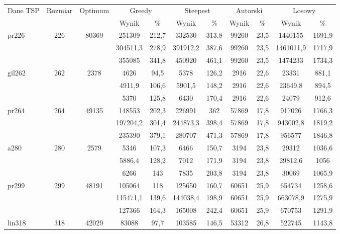 \begin{adjustwidth}{-1in}{-1in}
\begin{center}
\begin{tabular}{lcccccccccc}
\toprule
 \multirow{2}{*}{Dane TSP} & \multirow{2}{*}{Rozmiar} & \multirow{2}{*}{Optimum} & \multicolumn{2}{c}{Greedy} & \multicolumn{2}{c}{Steepest} & \multicolumn{2}{c}{Autorski} & \multicolumn{2}{c}{Losowy} \\
 & & & Wynik & \% & Wynik & \% & Wynik & \% & Wynik & \% \\
\toprule
\multirow{3}{*}{pr226} & \multirow{3}{*}{226} & \multirow{3}{*}{80369} & 251309 & 212,7  & 332530 & 313,8  & 99260 & 23,5  & 1440155 & 1691,9 \\
 & &  & 304511,3 & 278,9  & 391912,2 & 387,6  & 99260 & 23,5  & 1461011,9 & 1717,9 \\
 & &  & 355085 & 341,8  & 450920 & 461,1  & 99260 & 23,5  & 1474233 & 1734,3 \\
\midrule
\multirow{3}{*}{gil262} & \multirow{3}{*}{262} & \multirow{3}{*}{2378} & 4626 & 94,5  & 5378 & 126,2  & 2916 & 22,6  & 23331 & 881,1 \\
 & &  & 4911,9 & 106,6  & 5901,5 & 148,2  & 2916 & 22,6  & 23649,8 & 894,5 \\
 & &  & 5370 & 125,8  & 6430 & 170,4  & 2916 & 22,6  & 24079 & 912,6 \\
\midrule
\multirow{3}{*}{pr264} & \multirow{3}{*}{264} & \multirow{3}{*}{49135} & 148553 & 202,3  & 226991 & 362  & 57869 & 17,8  & 917026 & 1766,3 \\
 & &  & 197204,2 & 301,4  & 244873,3 & 398,4  & 57869 & 17,8  & 943002,8 & 1819,2 \\
 & &  & 235390 & 379,1  & 280707 & 471,3  & 57869 & 17,8  & 956577 & 1846,8 \\
\midrule
\multirow{3}{*}{a280} & \multirow{3}{*}{280} & \multirow{3}{*}{2579} & 5346 & 107,3  & 6466 & 150,7  & 3194 & 23,8  & 29312 & 1036,6 \\
 & &  & 5886,4 & 128,2  & 7012 & 171,9  & 3194 & 23,8  & 29812,6 & 1056 \\
 & &  & 6266 & 143  & 7835 & 203,8  & 3194 & 23,8  & 30069 & 1065,9 \\
\midrule
\multirow{3}{*}{pr299} & \multirow{3}{*}{299} & \multirow{3}{*}{48191} & 105064 & 118  & 125650 & 160,7  & 60651 & 25,9  & 654734 & 1258,6 \\
 & &  & 115471,1 & 139,6  & 144038,4 & 198,9  & 60651 & 25,9  & 663078,9 & 1275,9 \\
 & &  & 127366 & 164,3  & 165008 & 242,4  & 60651 & 25,9  & 670753 & 1291,9 \\
\midrule
\multirow{3}{*}{lin318} & \multirow{3}{*}{318} & \multirow{3}{*}{42029} & 83088 & 97,7  & 103585 & 146,5  & 53312 & 26,8  & 522745 & 1143,8 \\

\end{tabular}
\end{center}
\end{adjustwidth}
